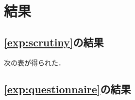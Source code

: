 \section{結果}
	\subsection{\ref{exp:scrutiny}の結果}
	次の表が得られた．
	
	
	
	
	\subsection{\ref{exp:questionnaire}の結果}
